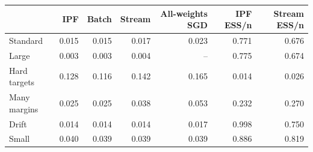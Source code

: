 \begin{tabular}{lrrrrrr}
\toprule
 & IPF & Batch & Stream & All-weights SGD & IPF ESS/n & Stream ESS/n \\
\midrule
Standard & 0.015 & 0.015 & 0.017 & 0.023 & 0.771 & 0.676 \\
Large & 0.003 & 0.003 & 0.004 & -- & 0.775 & 0.674 \\
Hard targets & 0.128 & 0.116 & 0.142 & 0.165 & 0.014 & 0.026 \\
Many margins & 0.025 & 0.025 & 0.038 & 0.053 & 0.232 & 0.270 \\
Drift & 0.014 & 0.014 & 0.014 & 0.017 & 0.998 & 0.750 \\
Small & 0.040 & 0.039 & 0.039 & 0.039 & 0.886 & 0.819 \\
\bottomrule
\end{tabular}

